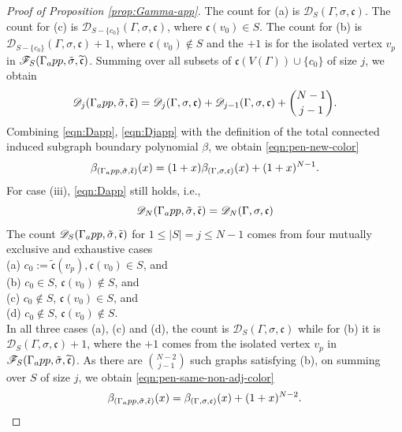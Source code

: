 \documentclass[10pt, reqno]{amsart}
\newcommand{\hf}{\hspace*{0.5cm}}
\theoremstyle{plain}
\theoremstyle{remark}
\theoremstyle{definition}
\numberwithin{equation}{section}
\begin{document}
\begin{proof}[Proof of Proposition \ref{prop:Gamma-app}]
The count for (a) is $\mathscr{D}_S(\Gamma,\sigma,\mathfrak{c})$. The count for (c) is $\mathscr{D}_{S-\{c_0\}}(\Gamma,\sigma,\mathfrak{c})$, where $\mathfrak{c}(v_0)\in S$. The count for (b) is $\mathscr{D}_{S-\{c_0\}}(\Gamma,\sigma,\mathfrak{c})+1$, where $\mathfrak{c}(v_0)\not\in S$ and the $+1$ is for the isolated vertex $v_p$ in $\mathscr{F}_S(\Gamma_\textup{app},\tilde{\sigma},\widetilde{\mathfrak{c}})$. Summing over all subsets of $\mathfrak{c}(V(\Gamma))\cup\{c_0\}$ of size $j$, we obtain
\begin{equation}\label{eqn:Djapp}
\mathscr{D}_j(\Gamma_\textup{app},\tilde{\sigma},\tilde{\mathfrak{c}})=\mathscr{D}_{j}(\Gamma,\sigma,\mathfrak{c})+\mathscr{D}_{j-1}(\Gamma,\sigma,\mathfrak{c})+{N-1\choose j-1}.
\end{equation}
Combining \eqref{eqn:Dapp}, \eqref{eqn:Djapp} with the definition of the total connected induced subgraph boundary polynomial ${\beta}$, we obtain \eqref{eqn:pen-new-color}
\begin{equation*}
{\beta}_{(\Gamma_\textup{app},\tilde{\sigma},\tilde{\mathfrak{c}})}(x)=(1+x){\beta}_{(\Gamma,\sigma,\mathfrak{c})}(x)+(1+x)^{N-1}. 
\end{equation*}
\hf For case (iii), \eqref{eqn:Dapp} still holds, i.e.,
\begin{equation*}%
\mathscr{D}_{N}(\Gamma_\textup{app},\tilde{\sigma},\tilde{\mathfrak{c}})=\mathscr{D}_N(\Gamma,\sigma,\mathfrak{c})
\end{equation*}
The count $\mathscr{D}_S(\Gamma_\textup{app},\tilde{\sigma},\tilde{\mathfrak{c}})$ for $1\leq |S|=j\leq N-1$ comes from four mutually exclusive and exhaustive cases\\
\hf (a) $c_0:=\tilde{\mathfrak{c}}(v_p),\mathfrak{c}(v_0)\in S$, and\\
\hf (b) $c_0\in S$, $\mathfrak{c}(v_0)\not\in S$, and\\
\hf (c) $c_0\not\in S$, $\mathfrak{c}(v_0)\in S$, and\\
\hf (d) $c_0\not\in S$, $\mathfrak{c}(v_0)\not\in S$.\\
In all three cases (a), (c) and (d), the count is $\mathscr{D}_S(\Gamma,\sigma,\mathfrak{c})$ while for (b) it is $\mathscr{D}_S(\Gamma,\sigma,\mathfrak{c})+1$, where the $+1$ comes from the isolated vertex $v_p$ in $\mathscr{F}_S(\Gamma_\textup{app},\tilde{\sigma},\widetilde{\mathfrak{c}})$. As there are ${N-2 \choose j-1}$ such graphs satisfying (b), on summing over $S$ of size $j$, we obtain \eqref{eqn:pen-same-non-adj-color}
\begin{equation*}
{\beta}_{(\Gamma_\textup{app},\tilde{\sigma},\tilde{\mathfrak{c}})}(x)={\beta}_{(\Gamma,\sigma,\mathfrak{c})}(x)+(1+x)^{N-2}. 
\end{equation*}
\end{proof}
\end{document}
